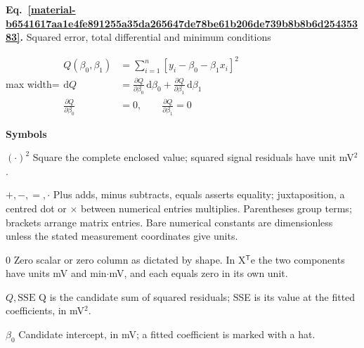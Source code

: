 \documentclass[11pt,a4paper]{article}
\begin{document}
\par\medskip
\noindent\begin{minipage}{\linewidth}
\label{material-b6541617aa1e4fe891255a35da265647de78be61b206de739b8b8b6d25435383}
\noindent\textbf{Eq.~\ref*{material-b6541617aa1e4fe891255a35da265647de78be61b206de739b8b8b6d25435383}.} Squared error, total differential and minimum conditions\par\nopagebreak
\begin{center}\begin{adjustbox}{max width=\linewidth}$\displaystyle \begin{aligned}Q(\beta_0,\beta_1)&=\sum_{i=1}^{n}[y_i-\beta_0-\beta_1 x_i]^2\\[.45em]\mathrm dQ&=\frac{\partial Q}{\partial\beta_0}\,\mathrm d\beta_0+\frac{\partial Q}{\partial\beta_1}\,\mathrm d\beta_1\\[.45em]\frac{\partial Q}{\partial\beta_0}&=0,\qquad \frac{\partial Q}{\partial\beta_1}=0\end{aligned}$\end{adjustbox}\end{center}

\par\noindent\textbf{Symbols}

\par\noindent\textbf{\(({\cdot})^2\)} Square the complete enclosed value; squared signal residuals have unit mV\ensuremath{{}^2}.

\par\noindent\textbf{\(+,-,=,\cdot\)} Plus adds, minus subtracts, equals asserts equality; juxtaposition, a centred dot or \ensuremath{\times} between numerical entries multiplies. Parentheses group terms; brackets arrange matrix entries. Bare numerical constants are dimensionless unless the stated measurement coordinates give units.

\par\noindent\textbf{\(0\)} Zero scalar or zero column as dictated by shape. In X\ensuremath{{}^{\mathsf T}}e the two components have units mV and min\ensuremath{\cdot}mV, and each equals zero in its own unit.

\par\noindent\textbf{\(Q,\mathrm{SSE}\)} Q is the candidate sum of squared residuals; SSE is its value at the fitted coefficients, in mV\ensuremath{{}^2}.

\par\noindent\textbf{\(\beta_0\)} Candidate intercept, in mV; a fitted coefficient is marked with a hat.


\end{minipage}
\end{document}
